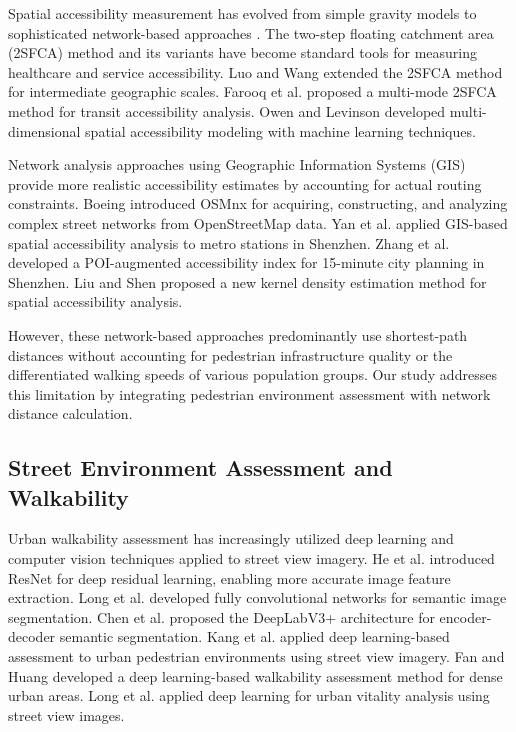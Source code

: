 \documentclass[10pt,conference,compsoc]{IEEEtran}
\begin{document}
Spatial accessibility measurement has evolved from simple gravity models \cite{hansen1959accessibility} to sophisticated network-based approaches \cite{geurs2004accessibility}. The two-step floating catchment area (2SFCA) method \cite{luo2004using,luo2011extending} and its variants \cite{dai2010spatial,wang2012measuring} have become standard tools for measuring healthcare and service accessibility. Luo and Wang \cite{luo2009modified} extended the 2SFCA method for intermediate geographic scales. Farooq et al. \cite{farooq2021quick} proposed a multi-mode 2SFCA method for transit accessibility analysis. Owen and Levinson \cite{owen2020multi} developed multi-dimensional spatial accessibility modeling with machine learning techniques.

Network analysis approaches using Geographic Information Systems (GIS) provide more realistic accessibility estimates by accounting for actual routing constraints. Boeing \cite{boeing2017osmnx} introduced OSMnx for acquiring, constructing, and analyzing complex street networks from OpenStreetMap data. Yan et al. \cite{yan2019gis} applied GIS-based spatial accessibility analysis to metro stations in Shenzhen. Zhang et al. \cite{zhang2020poi} developed a POI-augmented accessibility index for 15-minute city planning in Shenzhen. Liu and Shen \cite{liu2013new} proposed a new kernel density estimation method for spatial accessibility analysis.

However, these network-based approaches predominantly use shortest-path distances without accounting for pedestrian infrastructure quality or the differentiated walking speeds of various population groups. Our study addresses this limitation by integrating pedestrian environment assessment with network distance calculation.

\subsection{Street Environment Assessment and Walkability}

Urban walkability assessment has increasingly utilized deep learning and computer vision techniques applied to street view imagery. He et al. \cite{he2016deep} introduced ResNet for deep residual learning, enabling more accurate image feature extraction. Long et al. \cite{long2015fully} developed fully convolutional networks for semantic image segmentation. Chen et al. \cite{chen2018encoder} proposed the DeepLabV3+ architecture for encoder-decoder semantic segmentation. Kang et al. \cite{kang2023streetview} applied deep learning-based assessment to urban pedestrian environments using street view imagery. Fan and Huang \cite{fan2022walkability} developed a deep learning-based walkability assessment method for dense urban areas. Long et al. \cite{long2020deep} applied deep learning for urban vitality analysis using street view images.
\end{document}
